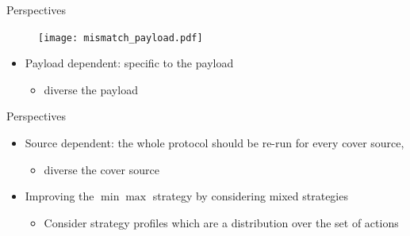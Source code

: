 \documentclass[10pt,aspectratio=169]{beamer}
\begin{document}
\begin{frame}{Perspectives}

    \begin{figure}[h]
        \texttt{[image: mismatch\_payload.pdf]}
    \end{figure}
    
    \begin{itemize}
        \item Payload dependent: specific to the payload
            \begin{itemize}
                \item diverse the payload
            \end{itemize}
    \end{itemize}

\end{frame}



\begin{frame}{Perspectives}
  
    \begin{itemize}
        \setlength\itemsep{2em}
    
        \item Source dependent: the whole protocol should be re-run for every cover source,  
                
            \begin{itemize}
                \item diverse the cover source
            \end{itemize}
            
        \pause 
        
        \item Improving the $\min\max$ strategy by considering mixed strategies
            \begin{itemize}
                \item Consider strategy profiles which are a distribution over the set of actions
            \end{itemize}
    
    \end{itemize}

\end{frame}


%
%
\end{document}
